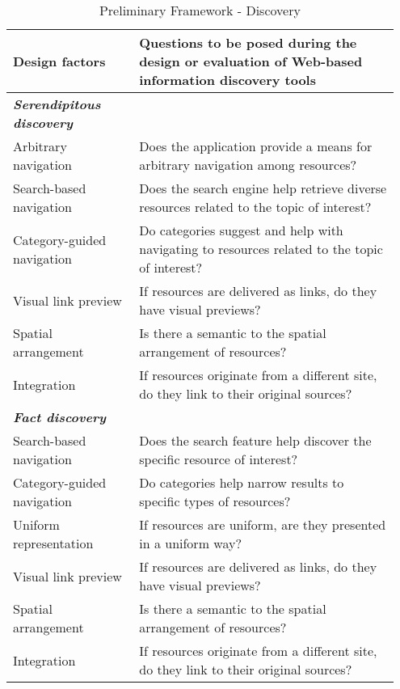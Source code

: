 \begin{table*}[ht!]
\caption{Preliminary Framework - Discovery}
\centering
\label{table:old_framework_discovery}
\footnotesize
\begin{tabular}{|p{0.31\linewidth}|p{0.64\linewidth}|}
\hline
\textbf{\small{Design factors}}   & \textbf{\small{Questions to be posed during the design or evaluation of Web-based information discovery tools 
}}  \\
\hline
\emph{\textbf{Serendipitous discovery}}     &                                                                                                           \\

Arbitrary navigation         & Does the application provide a means for arbitrary navigation among resources?                              \\
Search-based navigation      & Does the search engine help retrieve diverse resources related to the topic of interest?               \\
Category-guided navigation & Do categories suggest and help with navigating to resources related to the topic of interest?           \\
Visual link preview               & If resources are delivered as links, do they have visual previews?                                                                        \\
Spatial arrangement          & Is there a semantic to the spatial arrangement of resources?                                                  \\
Integration                  & If resources originate from a different site, do they link to their original sources?                   \\  

\emph{\textbf{Fact discovery}}                &                                                                                                           \\
Search-based navigation      & Does the search feature help discover the specific resource of interest?                                  \\
Category-guided navigation & Do categories help narrow results to specific types of resources?                                   \\
Uniform representation       & If resources are uniform, are they presented in a uniform way? \\
Visual link preview               & If resources are delivered as links, do they have visual previews?                                                                        \\
Spatial arrangement          & Is there a semantic to the spatial arrangement of resources?                                                    \\
Integration                  & If resources originate from a different site, do they link to their original sources?                   \\


\end{tabular}
\end{table*}
